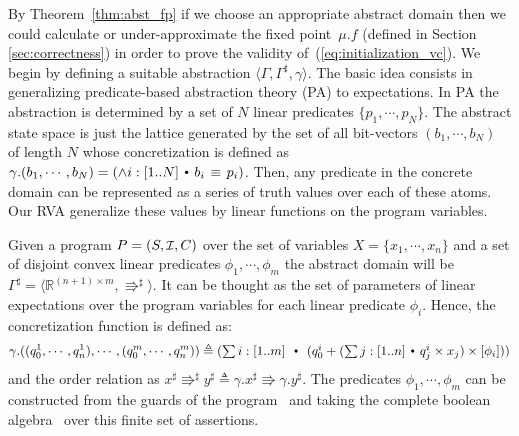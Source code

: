 \documentclass{eptcs}
\theoremstyle{plain}
\theoremstyle{definition}
\newcommand{\Real}{\ensuremath{\mathbb R}}
\newcommand{\Init}{\mbox{\small\ensuremath{\mathcal{I}}}}
\newcommand{\Def}{\ensuremath{\triangleq}}
\newcommand{\dotsep}{\mbox{\raisebox{0.4ex}{\tiny\ensuremath{\:\;\bullet\;\:}}}}
\newcommand{\Eq}{\ensuremath{\mathop{\:\equiv\:}}}
\newcommand{\elq}{\ensuremath{\Rrightarrow}}
\newcommand{\aelq}{\ensuremath{\Rrightarrow^\sharp}}
\newcommand{\noi}[0]{\noindent}
\begin{document}
By Theorem~\ref{thm:abst_fp} if we choose an appropriate abstract domain then we
could calculate or \mbox{under-approximate} the fixed point~$\mu.f$ (defined in
Section \ref{sec:correctness}) in order to prove the validity of~(\ref{eq:initialization_vc}). We begin by defining a suitable abstraction
$\langle \Gamma, \Gamma^\sharp, \gamma \rangle$. The basic idea consists in
generalizing predicate-based abstraction theory (PA)
\cite{graf97pa,uribe98abstractions} to expectations. In PA the abstraction is
determined by a set of $N$ linear predicates $\{p_1,\cdots, p_N\}$. The abstract
state space is just the lattice generated by the set of all \mbox{bit-vectors}
$(b_1,\cdots,b_N)$ of length $N$ whose concretization is defined as
$\gamma.(b_1,\cdots,b_N) = (\wedge i:[1..N] \dotsep b_i \Eq p_i)$. Then, any
predicate in the concrete domain can be represented as a series of truth values
over each of these atoms. Our RVA generalize these values by linear functions on
the program variables.
 
\noi Given a program $P = (S,\Init,C)$ over the set of variables
$X=\{x_1,\cdots,x_n\}$ and a set of disjoint convex linear predicates
$\phi_1,\cdots, \phi_m$ the abstract domain
will be $\Gamma^\sharp = \langle \Real^{(n+1)\times m}, \elq^\sharp
\rangle$. It can be thought as the set of parameters of linear
expectations over the program variables for each linear predicate
$\phi_i$. Hence, the concretization function is defined as:
\begin{equation} \label{eq:concr_func}
\gamma.((q_0^1,\cdots,q_n^1), \cdots, (q_0^m,\cdots,q_n^m))
\Def
\textstyle
(\sum i : [1..m] \;\dotsep\; 
  (q_0^i + (\sum j : [1..n] \dotsep q_j^i \times x_j) \times [\phi_i]))
\end{equation}
and the order relation as $x^\sharp \aelq y^\sharp \Def \gamma.x^\sharp \elq
\gamma.y^\sharp$\enspace. The predicates $\phi_1,\cdots, \phi_m$ can be
constructed from the guards of the program~\cite{graf97pa,uribe98abstractions}
and taking the complete boolean algebra~\cite{IntroductionLatticeOrderBook} over
this finite set of assertions.

\smallskip
\end{document}

